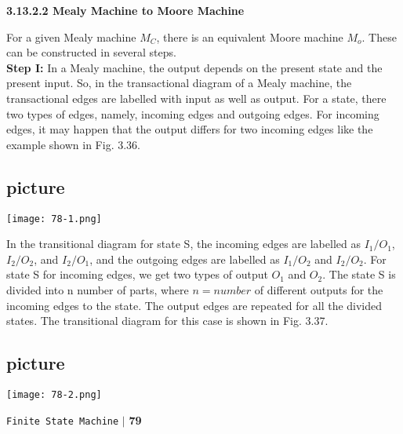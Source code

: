\documentclass{article}
\begin{document}
\vspace*{0.1cm}
\textbf{3.13.2.2 Mealy Machine to Moore Machine}

\vspace*{0.2cm}
For a given Mealy machine $M_C$, there is an equivalent Moore machine
$M_o$. These can be constructed in several steps.\\

\vspace*{0.2cm}
\textbf{Step I:} In a Mealy machine, the output depends on the present state and
the present input. So, in the transactional diagram of a Mealy machine,
the transactional edges are labelled with input as well as output. For a
state, there two types of edges, namely, incoming edges and outgoing
edges. For incoming edges, it may happen that the output differs for two
incoming edges like the example shown in Fig. 3.36.\\


\begin{center}
\section{picture}
\texttt{[image: 78-1.png]}
\end{center}

 \hspace*{0.2cm} In the transitional diagram for state S, the incoming edges are labelled
as $I_1/O_1$, $I_2/O_2$, and $I_2/O_1$, and the outgoing edges are labelled as $I_1/O_2$ and
$I_2/O_2$. For state S for incoming edges, we get two types of output $O_1$ and $O_2$. The state S is divided into n
number of parts, where $n = number$ of different outputs for the incoming edges to the state. The output
edges are repeated for all the divided states. The transitional diagram for this case is shown in Fig. 3.37.\\

\begin{center}
\section{picture}
\texttt{[image: 78-2.png]}
\end{center}

\begin{flushright}
 \texttt{Finite State Machine} \hspace*{0.10cm}\textbf{$|$} \textbf{79}\hspace*{0.5cm}
\end{flushright}
\end{document}
